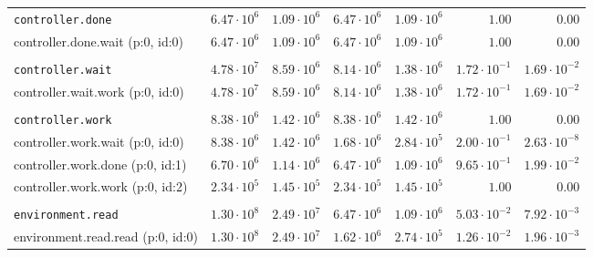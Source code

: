 \begin{table}[htbp]
{\begin{tabular}{lrrrrrr}
\\[-8pt]\texttt{controller.done}              & $6.47 \cdot 10^{6}$ & $1.09 \cdot 10^{6}$ & $6.47 \cdot 10^{6}$ & $1.09 \cdot 10^{6}$ &               $1.00$ &               $0.00$ \\
\hspace{3mm}controller.done.wait (p:0, id:0)  & $6.47 \cdot 10^{6}$ & $1.09 \cdot 10^{6}$ & $6.47 \cdot 10^{6}$ & $1.09 \cdot 10^{6}$ &               $1.00$ &               $0.00$ \\
\\[-8pt]\texttt{controller.wait}              & $4.78 \cdot 10^{7}$ & $8.59 \cdot 10^{6}$ & $8.14 \cdot 10^{6}$ & $1.38 \cdot 10^{6}$ & $1.72 \cdot 10^{-1}$ & $1.69 \cdot 10^{-2}$ \\
\hspace{3mm}controller.wait.work (p:0, id:0)  & $4.78 \cdot 10^{7}$ & $8.59 \cdot 10^{6}$ & $8.14 \cdot 10^{6}$ & $1.38 \cdot 10^{6}$ & $1.72 \cdot 10^{-1}$ & $1.69 \cdot 10^{-2}$ \\
\\[-8pt]\texttt{controller.work}              & $8.38 \cdot 10^{6}$ & $1.42 \cdot 10^{6}$ & $8.38 \cdot 10^{6}$ & $1.42 \cdot 10^{6}$ &               $1.00$ &               $0.00$ \\
\hspace{3mm}controller.work.wait (p:0, id:0)  & $8.38 \cdot 10^{6}$ & $1.42 \cdot 10^{6}$ & $1.68 \cdot 10^{6}$ & $2.84 \cdot 10^{5}$ & $2.00 \cdot 10^{-1}$ & $2.63 \cdot 10^{-8}$ \\
\hspace{3mm}controller.work.done (p:0, id:1)  & $6.70 \cdot 10^{6}$ & $1.14 \cdot 10^{6}$ & $6.47 \cdot 10^{6}$ & $1.09 \cdot 10^{6}$ & $9.65 \cdot 10^{-1}$ & $1.99 \cdot 10^{-2}$ \\
\hspace{3mm}controller.work.work (p:0, id:2)  & $2.34 \cdot 10^{5}$ & $1.45 \cdot 10^{5}$ & $2.34 \cdot 10^{5}$ & $1.45 \cdot 10^{5}$ &               $1.00$ &               $0.00$ \\
\\[-8pt]\texttt{environment.read}             & $1.30 \cdot 10^{8}$ & $2.49 \cdot 10^{7}$ & $6.47 \cdot 10^{6}$ & $1.09 \cdot 10^{6}$ & $5.03 \cdot 10^{-2}$ & $7.92 \cdot 10^{-3}$ \\
\hspace{3mm}environment.read.read (p:0, id:0) & $1.30 \cdot 10^{8}$ & $2.49 \cdot 10^{7}$ & $1.62 \cdot 10^{6}$ & $2.74 \cdot 10^{5}$ & $1.26 \cdot 10^{-2}$ & $1.96 \cdot 10^{-3}$ \\

\end{tabular}}
\end{table}
